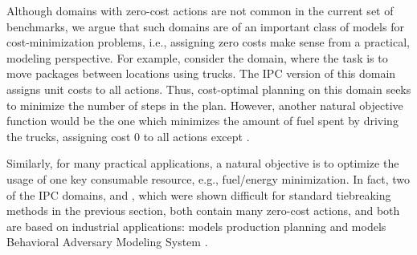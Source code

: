 
Although domains with zero-cost actions are not common in the current set of benchmarks, we argue that such domains are of an important class of models for cost-minimization problems, i.e.,
assigning zero costs make sense from a practical, modeling perspective.
For example, consider the  domain, where the task is to move packages between locations using trucks.
The IPC version of this domain assigns unit costs to all actions. Thus, cost-optimal planning on this domain seeks to minimize the number of steps in the plan.
However, another natural objective function would be the one which minimizes the amount of fuel spent by driving the trucks,
assigning cost 0 to all actions except .


Similarly, for many practical applications, a natural 
objective is to optimize the usage of one key consumable resource, e.g., fuel/energy minimization.
In fact, two of the IPC domains,  and , which were shown difficult for standard tiebreaking methods in the previous section, both contain many zero-cost actions, and both are based on industrial applications:   models production planning \cite{fink1999applications} and  models Behavioral Adversary Modeling System \cite[minimizing decryption, data transfer, etc.]{boddy2005course}.

